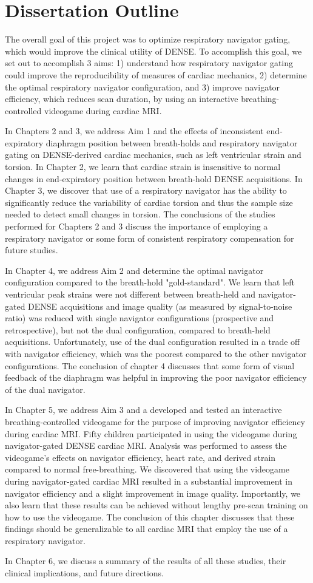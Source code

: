 \section{Dissertation Outline}
	The overall goal of this project was to optimize respiratory navigator gating, which would improve the clinical utility of DENSE. To accomplish this goal, we set out to accomplish 3 aims: 1) understand how respiratory navigator gating could improve the reproducibility of measures of cardiac mechanics, 2) determine the optimal respiratory navigator configuration, and 3) improve navigator efficiency, which reduces scan duration, by using an interactive breathing-controlled videogame during cardiac MRI.
	
	\indent In Chapters 2 and 3, we address Aim 1 and the effects of inconsistent end-expiratory diaphragm position between breath-holds and respiratory navigator gating on DENSE-derived cardiac mechanics, such as left ventricular strain and torsion. In Chapter 2, we learn that cardiac strain is insensitive to normal changes in end-expiratory position between breath-hold DENSE acquisitions. In Chapter 3, we discover that use of a respiratory navigator has the ability to significantly reduce the variability of cardiac torsion and thus the sample size needed to detect small changes in torsion. The conclusions of the studies performed for Chapters 2 and 3 discuss the importance of employing a respiratory navigator or some form of consistent respiratory compensation for future studies.
	
	\indent In Chapter 4, we address Aim 2 and determine the optimal navigator configuration compared to the breath-hold "gold-standard". We learn that left ventricular peak strains were not different between breath-held and navigator-gated DENSE acquisitions and image quality (as measured by signal-to-noise ratio) was reduced with single navigator configurations (prospective and retrospective), but not the dual configuration, compared to breath-held acquisitions. Unfortunately, use of the dual configuration resulted in a trade off with navigator efficiency, which was the poorest compared to the other navigator configurations. The conclusion of chapter 4 discusses that some form of visual feedback of the diaphragm was helpful in improving the poor navigator efficiency of the dual navigator.
	
	\indent In Chapter 5, we address Aim 3 and a developed and tested an interactive breathing-controlled videogame for the purpose of improving navigator efficiency during cardiac MRI. Fifty children participated in using the videogame during navigator-gated DENSE cardiac MRI. Analysis was performed to assess the videogame's effects on navigator efficiency, heart rate, and derived strain compared to normal free-breathing. We discovered that using the videogame during navigator-gated cardiac MRI resulted in a substantial improvement in navigator efficiency and a slight improvement in image quality. Importantly, we also learn that these results can be achieved without lengthy pre-scan training on how to use the videogame. The conclusion of this chapter discusses that these findings should be generalizable to all cardiac MRI that employ the use of a respiratory navigator.
	
	\indent In Chapter 6, we discuss a summary of the results of all these studies, their clinical implications, and future directions.

